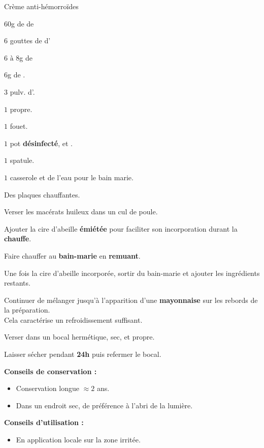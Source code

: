 \label{hemorroides}
\ficherecette
{%
    Crème anti-hémorroïdes
}
{%
    \item $60$g de  de 
    \item $6$ gouttes de  d'
    \item $6 \text{ à }8$g de 
    \item $6$g de .
    \item $3$ pulv. d'.
}
{%
    \item $1$  propre. 
    \item $1$ fouet. 
    \item $1$ pot \textbf{désinfecté},  et .
    \item $1$ spatule. 
    \item $1$ casserole et de l'eau pour le bain marie. 
    \item Des plaques chauffantes. 
}
{%
    \item Verser les macérats huileux dans un cul de poule. 
    \item Ajouter la cire d'abeille \textbf{émiétée} pour faciliter son incorporation durant la \textbf{chauffe}.
    \item Faire chauffer au \textbf{bain-marie} en \textbf{remuant}.
    \item Une fois la cire d'abeille incorporée, sortir du bain-marie et ajouter les ingrédients restants. 
    \item Continuer de mélanger jusqu'à l'apparition d'une \textbf{mayonnaise} sur les rebords de la préparation. \\
            Cela caractérise un refroidissement suffisant.
    \item Verser dans un bocal hermétique, sec, et propre. 
    \item Laisser sécher pendant \textbf{24h} puis refermer le bocal. 

}
{%
    \textbf{Conseils de conservation :}

    \begin{itemize}[label=\faPen]
        \item Conservation longue $\approx 2$ ans.
        \item Dans un endroit sec, de préférence à l'abri de la lumière. 
    \end{itemize}
    \textbf{Conseils d'utilisation :}

    \begin{itemize}[label=\faPen]
        \item En application locale sur la zone irritée.
    \end{itemize}
}
